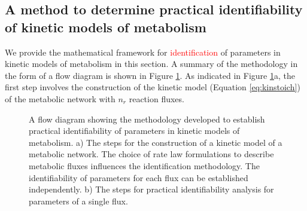 \documentclass[10pt]{article}
\begin{document}
	\subsection{A method to determine practical identifiability of kinetic models of metabolism}\label{sec:ident}
	We provide the mathematical framework for \textcolor{red}{identification} of parameters in kinetic models of metabolism in this section. A summary of the methodology in the form of a flow diagram is shown in Figure \ref{fig:ident-flowchart}. As indicated in Figure \ref{fig:ident-flowchart}a, the first step involves the construction of the kinetic model (Equation \ref{eq:kinstoich}) of the metabolic network with $n_r$ reaction fluxes.
	
	\begin{figure}[!tbhp]
		\caption{A flow diagram showing the methodology developed to establish practical identifiability of parameters in kinetic models of metabolism. a) The steps for the construction of a kinetic model of a metabolic network. The choice of rate law formulations to describe metabolic fluxes influences the identification methodology. The identifiability of parameters for each flux can be established independently. b) The steps for practical identifiability analysis for parameters of a single flux.}\label{fig:ident-flowchart}
	\end{figure}	
	
\end{document}
